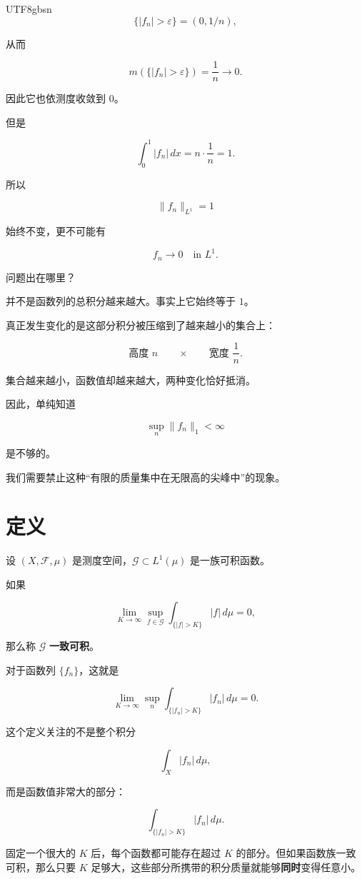 \documentclass[11pt]{article}
\begin{document}
\begin{CJK*}{UTF8}{gbsn}
\[
\{|f_n|>\varepsilon\}
=
(0,1/n),
\]

从而

\[
m(\{|f_n|>\varepsilon\})
=
\frac1n\to0.
\]

因此它也依测度收敛到 $0$。

但是

\[
\int_0^1|f_n|\,dx = n\cdot\frac{1}{n} = 1.
\]

所以

\[
\|f_n\|_{L^1}=1
\]

始终不变，更不可能有

\[
f_n\to0
\quad\text{in }L^1.
\]

问题出在哪里？

并不是函数列的总积分越来越大。事实上它始终等于 $1$。

真正发生变化的是这部分积分被压缩到了越来越小的集合上：

\[
\text{高度 }n
\qquad
\times
\qquad
\text{宽度 }\frac1n.
\]

集合越来越小，函数值却越来越大，两种变化恰好抵消。

因此，单纯知道

\[
\sup_n\|f_n\|_1<\infty
\]

是不够的。

我们需要禁止这种“有限的质量集中在无限高的尖峰中”的现象。


\section{定义}


设 $(X,\mathcal F,\mu)$ 是测度空间，$\mathcal G\subset L^1(\mu)$ 是一族可积函数。

如果

\[
\lim_{K\to\infty}
\sup_{f\in\mathcal G}
\int_{\{|f|>K\}}|f|\,d\mu
=
0,
\]

那么称 $\mathcal G$ \textbf{一致可积}。

对于函数列 $\{f_n\}$，这就是

\[
\lim_{K\to\infty}
\sup_n
\int_{\{|f_n|>K\}}
|f_n|\,d\mu
=
0.
\]

这个定义关注的不是整个积分

\[
\int_X|f_n|\,d\mu,
\]

而是函数值非常大的部分：

\[
\int_{\{|f_n|>K\}}|f_n|\,d\mu.
\]

固定一个很大的 $K$ 后，每个函数都可能存在超过 $K$ 的部分。但如果函数族一致可积，那么只要 $K$ 足够大，这些部分所携带的积分质量就能够\textbf{同时}变得任意小。


\end{CJK*}
\end{document}
